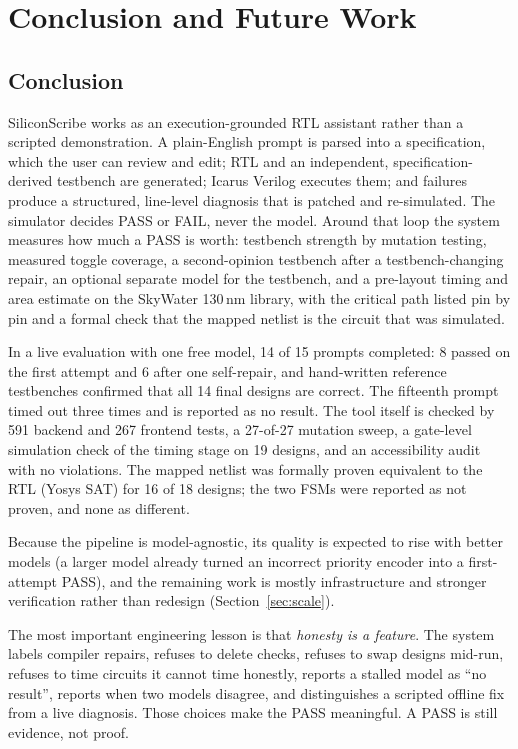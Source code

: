 \chapter{Conclusion and Future Work}
\label{sec:conclusion}

\section{Conclusion}
SiliconScribe works as an execution-grounded RTL assistant rather than a scripted
demonstration. A plain-English prompt is parsed into a specification, which the user
can review and edit; RTL and an independent, specification-derived testbench are
generated; Icarus Verilog executes them; and failures produce a structured,
line-level diagnosis that is patched and re-simulated. The simulator decides PASS or
FAIL, never the model. Around that loop the system measures how much a PASS is worth:
testbench strength by mutation testing, measured toggle coverage, a second-opinion
testbench after a testbench-changing repair, an optional separate model for the
testbench, and a pre-layout timing and area estimate on the SkyWater 130\,nm library,
with the critical path listed pin by pin and a formal check that the mapped netlist
is the circuit that was simulated.

In a live evaluation with one free model, 14 of 15 prompts completed: 8 passed on the
first attempt and 6 after one self-repair, and hand-written reference testbenches
confirmed that all 14 final designs are correct. The fifteenth prompt timed out three
times and is reported as no result. The tool itself is checked by 591 backend and 267
frontend tests, a 27-of-27 mutation sweep, a gate-level simulation check of the
timing stage on 19 designs, and an accessibility audit with no violations. The mapped
netlist was formally proven equivalent to the RTL (Yosys SAT) for 16 of 18 designs;
the two FSMs were reported as not proven, and none as different.

Because the pipeline is model-agnostic, its quality is expected to rise with better models (a larger model already turned an incorrect priority encoder into a first-attempt PASS), and the remaining work is mostly infrastructure and stronger verification rather than redesign (Section~\ref{sec:scale}).

The most important engineering lesson is that \emph{honesty is a feature}. The
system labels compiler repairs, refuses to delete checks, refuses to swap designs
mid-run, refuses to time circuits it cannot time honestly, reports a stalled model as
``no result'', reports when two models disagree, and distinguishes a scripted offline
fix from a live diagnosis. Those choices make the PASS meaningful. A PASS is still
evidence, not proof.


